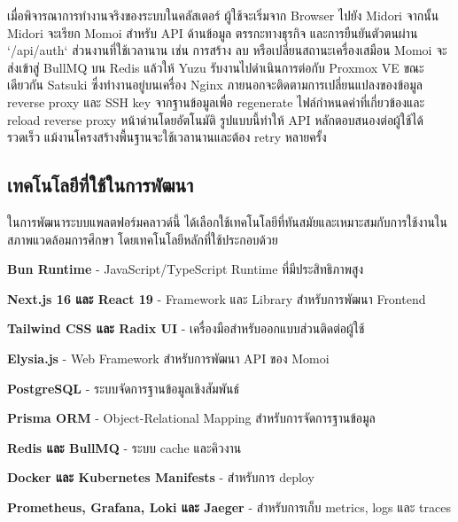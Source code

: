 \hspace*{1.3em}
เมื่อพิจารณาการทำงานจริงของระบบในคลัสเตอร์ ผู้ใช้จะเริ่มจาก Browser ไปยัง Midori จากนั้น Midori จะเรียก Momoi สำหรับ API ด้านข้อมูล ตรรกะทางธุรกิจ และการยืนยันตัวตนผ่าน `/api/auth` ส่วนงานที่ใช้เวลานาน เช่น การสร้าง ลบ หรือเปลี่ยนสถานะเครื่องเสมือน Momoi จะส่งเข้าสู่ BullMQ บน Redis แล้วให้ Yuzu รับงานไปดำเนินการต่อกับ Proxmox VE ขณะเดียวกัน Satsuki ซึ่งทำงานอยู่บนเครื่อง Nginx ภายนอกจะติดตามการเปลี่ยนแปลงของข้อมูล reverse proxy และ SSH key จากฐานข้อมูลเพื่อ regenerate ไฟล์กำหนดค่าที่เกี่ยวข้องและ reload reverse proxy หน้าด่านโดยอัตโนมัติ รูปแบบนี้ทำให้ API หลักตอบสนองต่อผู้ใช้ได้รวดเร็ว แม้งานโครงสร้างพื้นฐานจะใช้เวลานานและต้อง retry หลายครั้ง



\subsection{เทคโนโลยีที่ใช้ในการพัฒนา}
\hspace*{1.3em}
ในการพัฒนาระบบแพลตฟอร์มคลาวด์นี้ ได้เลือกใช้เทคโนโลยีที่ทันสมัยและเหมาะสมกับการใช้งานในสภาพแวดล้อมการศึกษา โดยเทคโนโลยีหลักที่ใช้ประกอบด้วย
\begin{mycustomitem}
    \item \textbf{Bun Runtime} - JavaScript/TypeScript Runtime ที่มีประสิทธิภาพสูง
    \item \textbf{Next.js 16 และ React 19} - Framework และ Library สำหรับการพัฒนา Frontend
    \item \textbf{Tailwind CSS และ Radix UI} - เครื่องมือสำหรับออกแบบส่วนติดต่อผู้ใช้
    \item \textbf{Elysia.js} - Web Framework สำหรับการพัฒนา API ของ Momoi
    \item \textbf{PostgreSQL} - ระบบจัดการฐานข้อมูลเชิงสัมพันธ์
    \item \textbf{Prisma ORM} - Object-Relational Mapping สำหรับการจัดการฐานข้อมูล
    \item \textbf{Redis และ BullMQ} - ระบบ cache และคิวงาน
    \item \textbf{Docker และ Kubernetes Manifests} - สำหรับการ deploy
    \item \textbf{Prometheus, Grafana, Loki และ Jaeger} - สำหรับการเก็บ metrics, logs และ traces
\end{mycustomitem}

